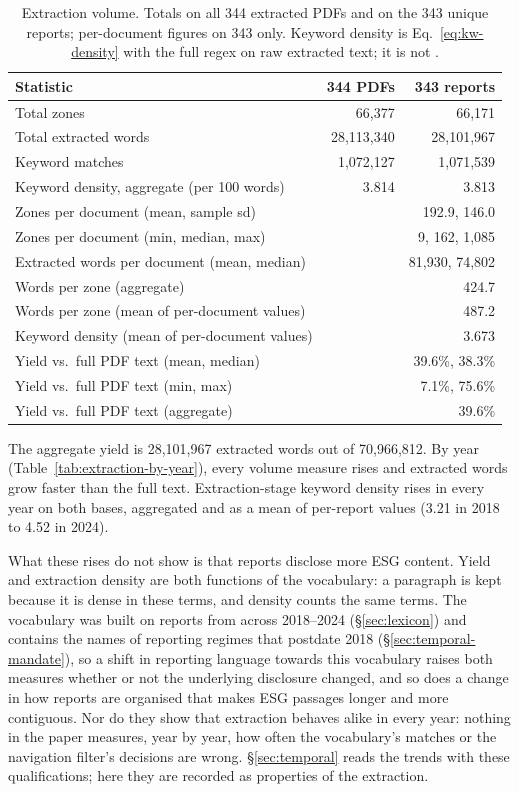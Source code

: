 \begin{table}[tbp]
\centering
\caption{Extraction volume. Totals on all 344
extracted PDFs and on the 343 unique reports; per-document figures on 343
only. Keyword density is Eq.~\eqref{eq:kw-density} with the full regex on
raw extracted text; it is not \susdens.}
\label{tab:extraction-yield}
\begin{tabular}{lrr}
\toprule
Statistic & 344 PDFs & 343 reports \\
\midrule
Total zones & 66,377 & 66,171 \\
Total extracted words & 28,113,340 & 28,101,967 \\
Keyword matches & 1,072,127 & 1,071,539 \\
Keyword density, aggregate (per 100 words) & 3.814 & 3.813 \\
\midrule
Zones per document (mean, sample sd) & & 192.9, 146.0 \\
Zones per document (min, median, max) & & 9, 162, 1,085 \\
Extracted words per document (mean, median) & & 81,930, 74,802 \\
Words per zone (aggregate) & & 424.7 \\
Words per zone (mean of per-document values) & & 487.2 \\
Keyword density (mean of per-document values) & & 3.673 \\
\midrule
Yield vs.\ full PDF text (mean, median) & & 39.6\%, 38.3\% \\
Yield vs.\ full PDF text (min, max) & & 7.1\%, 75.6\% \\
Yield vs.\ full PDF text (aggregate) & & 39.6\% \\
\bottomrule
\end{tabular}
\end{table}

The aggregate yield is 28,101,967 extracted words out of 70,966,812. By year
(Table~\ref{tab:extraction-by-year}), every volume measure rises and extracted
words grow faster than the full text. Extraction-stage keyword density rises
in every year on both bases, aggregated and as a mean of per-report values
(3.21 in 2018 to 4.52 in 2024).

What these rises do not show is that reports disclose more ESG content.
Yield and extraction density are both functions of the vocabulary: a
paragraph is kept because it is dense in these terms, and density counts the
same terms. The vocabulary was built on reports from across 2018--2024
(\S\ref{sec:lexicon}) and contains the names of reporting regimes
that postdate 2018 (\S\ref{sec:temporal-mandate}), so a shift in reporting
language towards this vocabulary raises both measures whether or not the
underlying disclosure changed, and so does a change in how reports are
organised that makes ESG passages longer and more contiguous. Nor do they
show that extraction behaves alike in every year: nothing in the paper
measures, year by year, how often the vocabulary's matches or the navigation
filter's decisions are wrong. \S\ref{sec:temporal} reads the trends with these
qualifications; here they are recorded as properties of the extraction.

